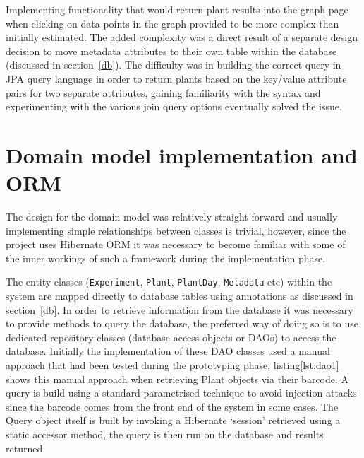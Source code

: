 Implementing functionality that would return plant results into the graph page when clicking on data points in the graph provided to be more complex than initially estimated. The added complexity was a direct result of a separate design decision to move metadata attributes to their own table within the database (discussed in section~\ref{db}). The difficulty was in building the correct query in JPA query language in order to return plants based on the key/value attribute pairs for two separate attributes, gaining familiarity with the syntax and experimenting with the various join query options eventually solved the issue.

\section{Domain model implementation and ORM}
The design for the domain model was relatively straight forward and usually implementing simple relationships between classes is trivial, however, since the project uses Hibernate ORM it was necessary to become familiar with some of the inner workings of such a framework during the implementation phase. 

The entity classes (\texttt{Experiment}, \texttt{Plant}, \texttt{PlantDay}, \texttt{Metadata} etc) within the system are mapped directly to database tables using annotations as discussed in section~\ref{db}. In order to retrieve information from the database it was necessary to provide methods to query the database, the preferred way of doing so is to use dedicated repository classes (database access objects or DAOs) to access the database. Initially the implementation of these DAO classes used a manual approach that had been tested during the prototyping phase, listing\ref{lst:dao1} shows this manual approach when retrieving Plant objects via their barcode. A query is build using a standard parametrised technique to avoid injection attacks since the barcode comes from the front end of the system in some cases. The Query object itself is built by invoking a Hibernate `session' retrieved using a static accessor method, the query is then run on the database and results returned.

\lstjava


